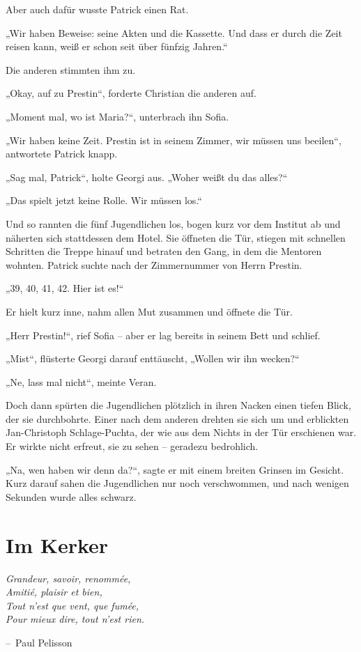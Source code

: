 \documentclass[oneside]{memoir}
\makeatletter
\newenvironment{chapquote}[2][2em]
  {\setlength{\@tempdima}{#1}%
   \def\chapquote@author{#2}%
   \parshape 1 \@tempdima \dimexpr\textwidth-2\@tempdima\relax%
   \itshape}
  {\par\normalfont\hfill--\ \chapquote@author\hspace*{\@tempdima}\par\bigskip}
\makeatother
\begin{document}
Aber auch dafür wusste Patrick einen Rat.

„Wir haben Beweise: seine Akten und die Kassette. Und dass er durch die Zeit reisen kann, weiß er schon seit über fünfzig Jahren.“

Die anderen stimmten ihm zu.

„Okay, auf zu Prestin“, forderte Christian die anderen auf.

„Moment mal, wo ist Maria?“, unterbrach ihn Sofia.

„Wir haben keine Zeit. Prestin ist in seinem Zimmer, wir müssen uns beeilen“, antwortete Patrick knapp.

„Sag mal, Patrick“, holte Georgi aus. „Woher weißt du das alles?“

„Das spielt jetzt keine Rolle. Wir müssen los.“

Und so rannten die fünf Jugendlichen los, bogen kurz vor dem Institut ab und näherten sich stattdessen dem Hotel. Sie öffneten die Tür, stiegen mit schnellen Schritten die Treppe hinauf und betraten den Gang, in dem die Mentoren wohnten. Patrick suchte nach der Zimmernummer von Herrn Prestin.

„39, 40, 41, 42. Hier ist es!“

Er hielt kurz inne, nahm allen Mut zusammen und öffnete die Tür.

„Herr Prestin!“, rief Sofia – aber er lag bereits in seinem Bett und schlief.

„Mist“, flüsterte Georgi darauf enttäuscht, „Wollen wir ihn wecken?“

„Ne, lass mal nicht“, meinte Veran.

Doch dann spürten die Jugendlichen plötzlich in ihren Nacken einen tiefen Blick, der sie durchbohrte. Einer nach dem anderen drehten sie sich um und erblickten Jan-Christoph Schlage-Puchta, der wie aus dem Nichts in der Tür erschienen war. Er wirkte nicht erfreut, sie zu sehen – geradezu bedrohlich.

„Na, wen haben wir denn da?“, sagte er mit einem breiten Grinsen im Gesicht. Kurz darauf sahen die Jugendlichen nur noch verschwommen, und nach wenigen Sekunden wurde alles schwarz.

     
     
\chapter{Im Kerker} %
\begin{chapquote}{Paul Pelisson}
\glqq Grandeur, savoir, renommée, \\
Amitié, plaisir et bien, \\
Tout n’est que vent, que fumée, \\
Pour mieux dire, tout n’est rien.\grqq
\end{chapquote}
\end{document}
